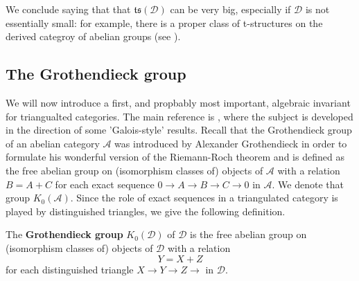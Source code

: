 We conclude saying that that $\mathfrak{ts}(\mathscr{D})$ can be very big, especially  if $\mathscr{D}$ is not essentially small: for example, there is a proper class of t-structures on the derived categroy of abelian groups (see \cite{stan}).

\newpage

\subsection{The Grothendieck group} 
We will now introduce a first, and propbably most important, algebraic invariant for triangualted categories. The main reference is \cite{tom}, where the subject is developed in the direction of some 'Galois-style' results. Recall that the Grothendieck group of an abelian category $\mathscr{A}$ was introduced by Alexander Grothendieck in order to formulate his wonderful version of the Riemann-Roch theorem and is defined as the free abelian group on (isomorphism classes of) objects of $\mathscr{A}$ with a relation $B=A+C$ for each exact sequence $0 \longrightarrow A \longrightarrow B \longrightarrow C \longrightarrow 0$ in $\mathscr{A}$. We denote that group $K_0(\mathscr{A})$. Since the role of exact sequences in a triangulated category is played by distinguished triangles, we give the following definition. 

\begin{defn}
The \textbf{Grothendieck group} $K_0(\mathscr{D})$ of $\mathscr{D}$ is the free abelian group on (isomorphism classes of) objects of $\mathscr{D}$ with a relation $$Y=X+Z$$ for each distinguished triangle $X \longrightarrow Y \longrightarrow Z \longrightarrow$ in $\mathscr{D}$. 
\end{defn}

